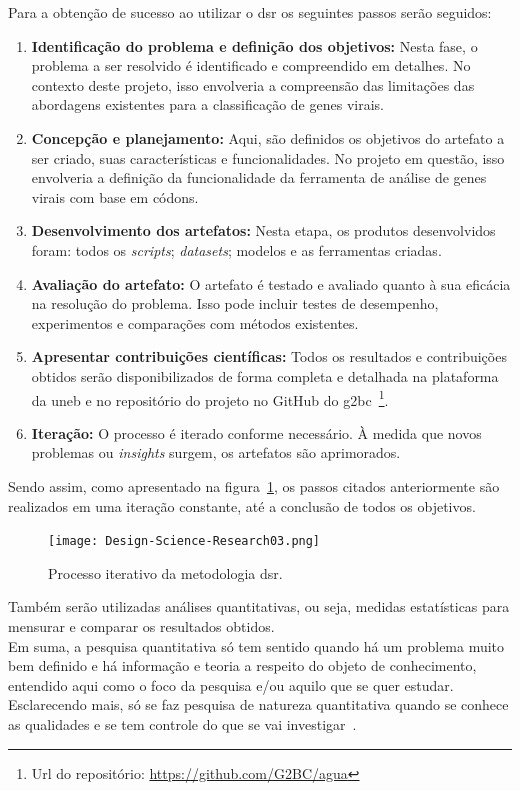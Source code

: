 Para a obtenção de sucesso ao utilizar o \gls{dsr} os seguintes passos serão seguidos:
\begin{enumerate}
  \item \textbf{Identificação do problema e definição dos objetivos:} Nesta fase, o problema a ser resolvido é identificado e compreendido em detalhes. No contexto deste projeto, isso envolveria a compreensão das limitações das abordagens existentes para a classificação de genes virais.
  \item \textbf{Concepção e planejamento:} Aqui, são definidos os objetivos do artefato a ser criado, suas características e funcionalidades. No projeto em questão, isso envolveria a definição da funcionalidade da ferramenta de análise de genes virais com base em códons.
  \item \textbf{Desenvolvimento dos artefatos:} Nesta etapa, os produtos desenvolvidos foram: todos os \textit{scripts}; \textit{datasets}; modelos e as ferramentas criadas.
  \item \textbf{Avaliação do artefato:} O artefato é testado e avaliado quanto à sua eficácia na resolução do problema. Isso pode incluir testes de desempenho, experimentos e comparações com métodos existentes.
  \item \textbf{Apresentar contribuições científicas:} Todos os resultados e contribuições obtidos serão disponibilizados de forma completa e detalhada na plataforma da \gls{uneb} e no repositório do projeto no GitHub do \gls{g2bc}~\footnote{Url do repositório: \url{https://github.com/G2BC/agua}}.
  \item \textbf{Iteração:} O processo é iterado conforme necessário. À medida que novos problemas ou \textit{insights} surgem, os artefatos são aprimorados.
\end{enumerate}

Sendo assim, como apresentado na figura~\ref{fig:processoDSR}, os passos citados anteriormente são realizados em uma iteração constante, até a conclusão de todos os  objetivos.

\begin{figure}[htb]
  \centering
  \caption{Processo iterativo da metodologia \gls{dsr}.}
  \texttt{[image: Design-Science-Research03.png]}
  ~\label{fig:processoDSR}
\end{figure}

Também serão utilizadas análises quantitativas, ou seja, medidas estatísticas para mensurar e comparar os resultados obtidos.\\
Em suma, a pesquisa quantitativa só tem sentido quando há um problema muito bem definido e há informação e teoria a respeito do objeto de conhecimento, entendido aqui como o foco da pesquisa e/ou aquilo que se quer estudar. Esclarecendo mais, só se faz pesquisa de natureza quantitativa quando se conhece as qualidades e se tem controle do que se vai investigar~\cite{da_silva_pesquisa_2014}.

